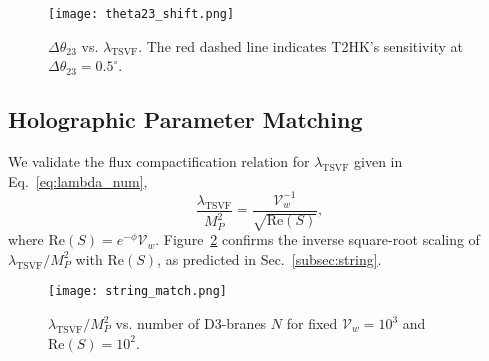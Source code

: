 \documentclass[12pt, onecolumn]{article}
\theoremstyle{definition}
\newcommand{\tsvf}{\lambda_{\mathrm{TSVF}}}
\numberwithin{equation}{section}
\begin{document}
\begin{figure}[htbp]  
\centering  
\texttt{[image: theta23\_shift.png]}  
\caption{\(\Delta\theta_{23}\) vs. \(\tsvf\). The red dashed line indicates T2HK's sensitivity at \(\Delta\theta_{23} = 0.5^\circ\).}  
\label{fig:theta23}  
\end{figure}  


\subsection{Holographic Parameter Matching}  
\label{subsec:string_sim}  

We validate the flux compactification relation for \(\tsvf\) given in Eq.~\eqref{eq:lambda_num},  
\begin{equation}
\frac{\tsvf}{M_P^2} = \frac{\mathcal{V}_w^{-1}}{\sqrt{\mathrm{Re}(S)}},  
\label{eq:lambda_num}  
\end{equation}  
where \(\mathrm{Re}(S) = e^{-\phi}\mathcal{V}_w\). Figure~\ref{fig:string_match} confirms the inverse square-root scaling of \(\tsvf/M_P^2\) with \(\mathrm{Re}(S)\), as predicted in Sec.~\ref{subsec:string}.  

\begin{figure}[htbp]  
\centering  
\texttt{[image: string\_match.png]}  
\caption{\(\tsvf/M_P^2\) vs. number of D3-branes \(N\) for fixed \(\mathcal{V}_w = 10^3\) and \(\mathrm{Re}(S) = 10^2\).}  
\label{fig:string_match}  
\end{figure}  
\end{document}
